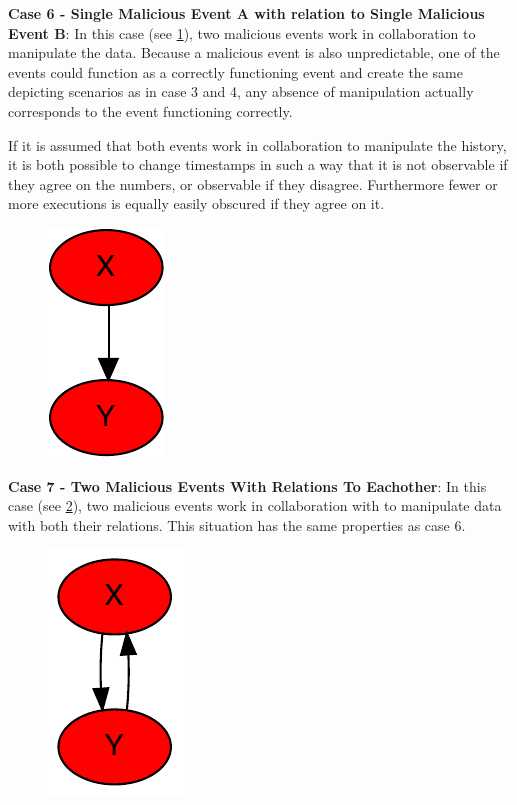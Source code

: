 	\newpar \textbf{Case 6 - Single Malicious Event A with relation to Single Malicious Event B}: In this case (see \ref{fig:consensus:single-malicious-with-twoway-malicious-relation}), two malicious events work in collaboration to manipulate the data. Because a malicious event is also unpredictable, one of the events could function as a correctly functioning event and create the same depicting scenarios as in case 3 and 4, any absence of manipulation actually corresponds to the event functioning correctly.
	
	If it is assumed that both events work in collaboration to manipulate the history, it is both possible to change timestamps in such a way that it is not observable if they agree on the numbers, or observable if they disagree. Furthermore fewer or more executions is equally easily obscured if they agree on it.
	
	
	\begin{figure}[H]
		\centering
		\includegraphics[]{5validation/images/4.pdf}
		\caption{}
		\label{fig:consensus:single-malicious-with-twoway-malicious-relation}
	\end{figure}
	
	\newpar \textbf{Case 7 - Two Malicious Events With Relations To Eachother}: In this case (see \ref{fig:consensus:two-malicious-with-twoway-malicious-relation}), two malicious events work in collaboration with to manipulate data with both their relations. This situation has the same properties as case 6.
	
	\begin{figure}[H]
		\centering
		\includegraphics[]{5validation/images/7.pdf}
		\caption{}
		\label{fig:consensus:two-malicious-with-twoway-malicious-relation}
	\end{figure}
	
